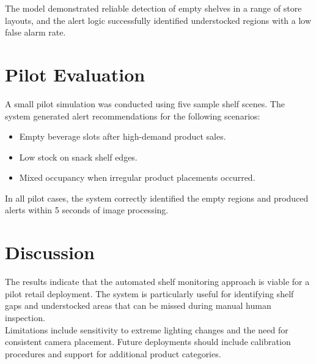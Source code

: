 The model demonstrated reliable detection of empty shelves in a range of store layouts, and the alert logic successfully identified understocked regions with a low false alarm rate.

\section{Pilot Evaluation}

A small pilot simulation was conducted using five sample shelf scenes. The system generated alert recommendations for the following scenarios:
\begin{itemize}
    \item Empty beverage slots after high-demand product sales.
    \item Low stock on snack shelf edges.
    \item Mixed occupancy when irregular product placements occurred.
\end{itemize}

In all pilot cases, the system correctly identified the empty regions and produced alerts within 5 seconds of image processing.

\section{Discussion}

The results indicate that the automated shelf monitoring approach is viable for a pilot retail deployment. The system is particularly useful for identifying shelf gaps and understocked areas that can be missed during manual human inspection.
\\
Limitations include sensitivity to extreme lighting changes and the need for consistent camera placement. Future deployments should include calibration procedures and support for additional product categories.
